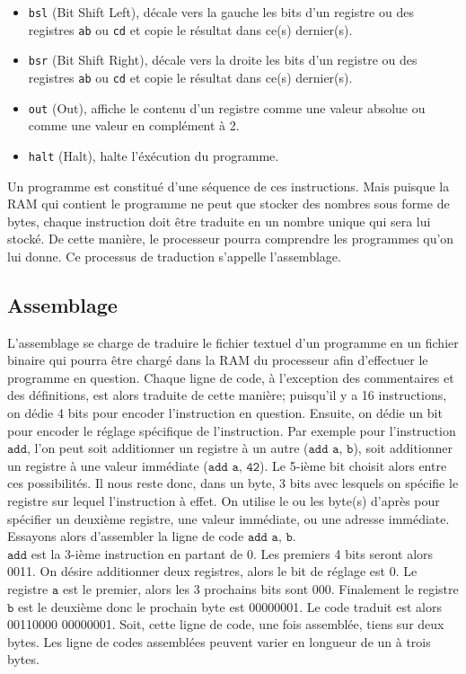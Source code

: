 \documentclass{article}
\begin{document}
\begin{itemize}
    \item \texttt{bsl} (Bit Shift Left), décale vers la gauche les bits d'un registre ou des registres \texttt{ab} ou \texttt{cd} et copie le résultat dans ce(s) dernier(s).
    \item \texttt{bsr} (Bit Shift Right), décale vers la droite les bits d'un registre ou des registres \texttt{ab} ou \texttt{cd} et copie le résultat dans ce(s) dernier(s).
    \item \texttt{out} (Out), affiche le contenu d'un registre comme une valeur absolue ou comme une valeur en complément à 2.
    \item \texttt{halt} (Halt), halte l'éxécution du programme.
\end{itemize}
Un programme est constitué d'une séquence de ces instructions. Mais puisque la RAM qui contient le programme ne peut que stocker des nombres sous forme de bytes, chaque instruction doit être traduite en un nombre unique qui sera lui stocké. De cette manière, le processeur pourra comprendre les programmes qu'on lui donne. Ce processus de traduction s'appelle l'assemblage.
\newpage
\subsection{Assemblage}
L'assemblage se charge de traduire le fichier textuel d'un programme en un fichier binaire qui pourra être chargé dans la RAM du processeur afin d’effectuer le programme en question. \cite{salomon1992assemblers} Chaque ligne de code, à l'exception des commentaires et des définitions, est alors traduite de cette manière; puisqu'il y a 16 instructions, on dédie 4 bits pour encoder l'instruction en question. Ensuite, on dédie un bit pour encoder le réglage spécifique de l'instruction. Par exemple pour l'instruction $\texttt{add}$, l'on peut soit additionner un registre à un autre ($\texttt{add a, b}$), soit additionner un registre à une valeur immédiate ($\texttt{add a, 42}$). Le 5-ième bit choisit alors entre ces possibilités. Il nous reste donc, dans un byte, 3 bits avec lesquels on spécifie le registre sur lequel l'instruction à effet. On utilise le ou les byte(s) d'après pour spécifier un deuxième registre, une valeur immédiate, ou une adresse immédiate. Essayons alors d'assembler la ligne de code $\texttt{add a, b}$.\\ $\texttt{add}$ est la 3-ième instruction en partant de 0. Les premiers 4 bits seront alors 0011. On désire additionner deux registres, alors le bit de réglage est 0. Le registre $\texttt{a}$ est le premier, alors les 3 prochains bits sont 000. Finalement le registre $\texttt{b}$ est le deuxième donc le prochain byte est 00000001. Le code traduit est alors 00110000 00000001. Soit, cette ligne de code, une fois assemblée, tiens sur deux bytes. Les ligne de codes assemblées peuvent varier en longueur de un à trois bytes.
\end{document}
